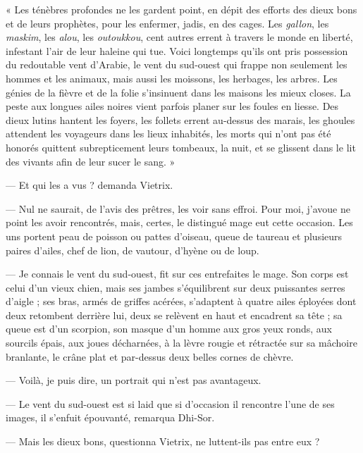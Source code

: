 \documentclass[a4paper, 11pt, oneside, polutonikogreek, french]{article}
\begin{document}
« Les ténèbres profondes ne les gardent point, en dépit des efforts des dieux bons et de leurs prophètes, pour les enfermer, jadis, en des cages. Les \emph{gallon}, les \emph{maskim}, les \emph{alou}, les \emph{outoukkou}, cent autres errent à travers le monde en liberté, infestant l'air de leur haleine qui tue. Voici longtemps qu'ils ont pris possession du redoutable vent d'Arabie, le vent du sud-ouest qui frappe non seulement les hommes et les animaux, mais aussi les moissons, les herbages, les arbres. Les génies de la fièvre et de la folie s'insinuent dans les maisons les mieux closes. La peste aux longues ailes noires vient parfois planer sur les foules en liesse. Des dieux lutins hantent les foyers, les follets errent au-dessus des marais, les ghoules attendent les voyageurs dans les lieux inhabités, les morts qui n'ont pas été honorés quittent subrepticement leurs tombeaux, la nuit, et se glissent dans le lit des vivants afin de leur sucer le sang. »

--- Et qui les a vus ? demanda Vietrix.

--- Nul ne saurait, de l'avis des prêtres, les voir sans effroi. Pour moi, j'avoue ne point les avoir rencontrés, mais, certes, le distingué mage eut cette occasion. Les uns portent peau de poisson ou pattes d'oiseau, queue de taureau et plusieurs paires d'ailes, chef de lion, de vautour, d'hyène ou de loup.

\bigskip
\centerline{\EightStarTaper}
\centerline{\EightStarTaper\EightStarTaper}
\bigskip

--- Je connais le vent du sud-ouest, fit sur ces entrefaites le mage. Son corps est celui d'un vieux chien, mais ses jambes s'équilibrent sur deux puissantes serres d'aigle ; ses bras, armés de griffes acérées, s'adaptent à quatre ailes éployées dont deux retombent derrière lui, deux se relèvent en haut et encadrent sa tête ; sa queue est d'un scorpion, son masque d'un homme aux gros yeux ronds, aux sourcils épais, aux joues décharnées, à la lèvre rougie et rétractée sur sa mâchoire branlante, le crâne plat et par-dessus deux belles cornes de chèvre.

--- Voilà, je puis dire, un portrait qui n'est pas avantageux.

--- Le vent du sud-ouest est si laid que si d'occasion il rencontre l'une de ses images, il s'enfuit épouvanté, remarqua Dhi-Sor.

\bigskip
\centerline{\EightStarTaper}
\centerline{\EightStarTaper\EightStarTaper}
\bigskip

--- Mais les dieux bons, questionna Vietrix, ne luttent-ils pas entre eux ?
\end{document}
